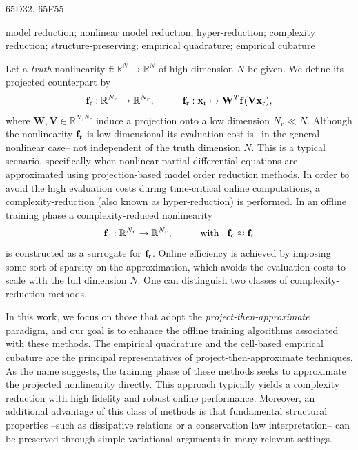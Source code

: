 \documentclass[onefignum,onetabnum]{siamart251104}
\newcommand{\bv}[1]{{\mathbf #1}}
\newcommand{\bt}[1]{{\mathbf{#1}}}
\newcommand{\com}[1]{{{#1}_{\rm{c}}}} %
\newcommand{\rom}[1]{{{#1}_{\rm{r}}}}
\newcommand{\Nr}{{N_r}}
\newcommand{\R}{\mathbb{R}}
\newcommand{\ffun}{{\bv{f}}}
\begin{document}
%
\begin{AMS}
65D32, 65F55
\end{AMS}

%
\begin{keywords}
	model reduction; nonlinear model reduction; hyper-reduction; complexity reduction; structure-preserving; empirical quadrature; empirical cubature
\end{keywords}


Let a  \textit{truth} nonlinearity $\ffun: \R^N \to \R^N$ of high dimension $N$ be given. We define its projected counterpart by
\begin{align*}
	\rom{\ffun}: \R^\Nr \to \R^\Nr, \hspace{1cm} \rom{\ffun}: \rom{\bv{x}} \mapsto \bt W^T \ffun(\bt V \rom{\bv{x}}),
\end{align*}
where $\bt W, \bt V \in \R^{N,\Nr}$  induce a projection onto a low dimension $\Nr \ll N$.
Although the nonlinearity $\rom{\ffun}$ is low-dimensional its evaluation cost is --in the general nonlinear case-- not independent of the truth dimension $N$. This is a typical scenario, specifically when nonlinear partial differential equations are approximated using projection-based model order reduction methods. In order to avoid the high evaluation costs during time-critical online computations, a complexity-reduction (also known as hyper-reduction) is performed. In an offline training phase a complexity-reduced nonlinearity
\begin{align*}
\com{\ffun}: \R^\Nr \to \R^\Nr, \hspace{1cm } \text{with} \hspace{0.3cm} \com{\ffun} \approx \rom{\ffun}
\end{align*}
is constructed as a surrogate for $\rom{\ffun}$. Online efficiency is achieved by imposing some sort of sparsity on the approximation, which avoids the evaluation costs to scale with the full dimension $N$.
One can distinguish two classes of complexity-reduction methods.

In this work, we focus on those that adopt the \textit{project-then-approximate} paradigm, and our goal is to enhance the offline training algorithms associated with these methods.
The empirical quadrature \cite{art:equad-eff-yano,art:hyperreduction-fem-cubature,art:lp-cub-yano} and the cell-based empirical cubature \cite{art:comred-ecsw, art:cub-efficient-integration-cubature, inbook:ecsw-compBottle} are the principal representatives of project-then-approximate techniques. As the name suggests, the training phase of these methods seeks to approximate the projected nonlinearity directly. This approach typically yields a complexity reduction with high fidelity and robust online performance. Moreover, an additional advantage of this class of methods is that fundamental structural properties --such as dissipative relations or a conservation law interpretation-- can be preserved through simple variational arguments in many relevant settings.
\end{document}
